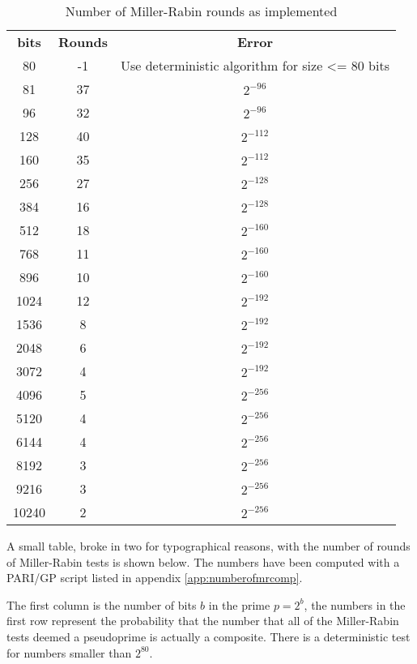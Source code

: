 \documentclass[synpaper]{book}
\begin{document}
\begin{table}[h]
\begin{center}
\begin{tabular}{c c c}
\textbf{bits} & \textbf{Rounds} & \textbf{Error}\\
 80 & -1  &  Use deterministic algorithm for size <= 80 bits \\
 81 & 37  &  $2^{-96}$ \\
 96 & 32  & $2^{-96}$ \\
 128 & 40  & $2^{-112}$ \\
 160 & 35  & $2^{-112}$ \\
 256 & 27  & $2^{-128}$ \\
 384 & 16  & $2^{-128}$ \\
 512 & 18  & $2^{-160}$ \\
 768 & 11  & $2^{-160}$ \\
 896 & 10  & $2^{-160}$ \\
 1024 & 12  & $2^{-192}$ \\
 1536 & 8   & $2^{-192}$ \\
 2048 & 6   & $2^{-192}$ \\
 3072 & 4   & $2^{-192}$ \\
 4096 & 5   & $2^{-256}$ \\
 5120 & 4   & $2^{-256}$ \\
 6144 & 4   & $2^{-256}$ \\
 8192 & 3   & $2^{-256}$ \\
 9216 & 3   & $2^{-256}$ \\
 10240 & 2  & $2^{-256}$
\end{tabular}
\caption{ Number of Miller-Rabin rounds as implemented } \label{table:millerrabinrunsimpl}
\end{center}
\end{table}

A small table, broke in two for typographical reasons, with the number of rounds of Miller-Rabin tests is shown below. The numbers have been computed with a PARI/GP script listed in appendix \ref{app:numberofmrcomp}.

The first column is the number of bits $b$ in the prime $p = 2^b$, the numbers in the first row represent the
probability that the number that all of the Miller-Rabin tests deemed a pseudoprime is actually a composite. There is a deterministic test for numbers smaller than $2^{80}$.
\end{document}
